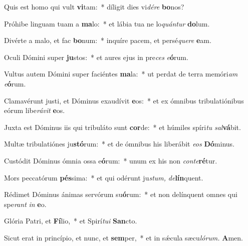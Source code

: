 \item Quis est homo qui vult \textbf{vi}tam:~* díligit dies vi\textit{dére} \textbf{bo}nos?
\item Próhibe linguam tuam a \textbf{ma}lo:~* et lábia tua ne lo\textit{quántur} \textbf{do}lum.
\item Divérte a malo, et fac \textbf{bo}num:~* inquíre pacem, et persé\tinyhspace\textit{quere} \textbf{e}am.
\item Oculi Dómini super \textbf{ju}stos:~* et aures ejus in pre\tinyhspace\textit{ces} \textit{e}\textbf{ó}rum.
\item Vultus autem Dómini super faciéntes \textbf{ma}la:~* ut perdat de terra memóri\tinyhspace\textit{am} \textit{e}\textbf{ó}rum.
\item Clamavérunt justi, et Dóminus exaudívit \textbf{e}os:~* et ex ómnibus tribulatiónibus eórum libe\tinyhspace\textit{rávit} \textbf{e}os.
\item Juxta est Dóminus iis qui tribuláto sunt \textbf{cor}de:~* et húmiles spíri\textit{tu} \textit{sal}\textbf{vá}bit.
\item Multæ tribulatiónes ju\textbf{stó}rum:~* et de ómnibus his liberábit \textit{eos} \textbf{Dó}minus.
\item Custódit Dóminus ómnia ossa e\textbf{ó}rum:~* unum ex his non \textit{conte}\textbf{ré}tur.
\item Mors peccatórum \textbf{pés}sima:~* et qui odérunt ju\spurhspace\textit{stum,} \textit{de}\textbf{lín}quent.
\item Rédimet Dóminus ánimas servórum su\textbf{ó}rum:~* et non delínquent omnes qui spe\textit{rant} \textit{in} \textbf{e}o.
\item Glória Patri, et \textbf{Fí}lio,~* et Spirí\tinyhspace\textit{tui} \textbf{San}cto.
\item Sicut erat in princípio, et nunc, et \textbf{sem}per,~* et in sǽcula sæcu\tinyhspace\textit{lórum.} \textbf{A}men.